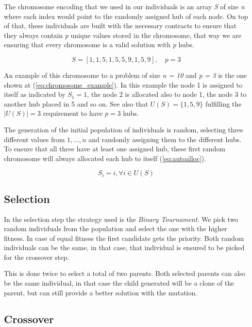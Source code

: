 \documentclass[onecolumn]{IEEEtran}
\begin{document}
The chromosome encoding that we used in our individuals is an array \emph{S} of size \emph{n} where each
index would point to the randomly assigned hub of each node. On top of that, these individuals are built
with the necessary contracts to ensure that they always contain \emph{p} unique values stored in the chromosome,
that way we are ensuring that every chromosome is a valid solution with \emph{p} hubs.

\begin{equation}
  S = [1, 1, 5, 1, 5, 5, 9, 1, 5, 9 ],\quad p = 3 \label{eq:chromosome_example}
\end{equation}

An example of this chromosome to a problem of size \emph{n = 10} and \emph{p = 3} is the one shown
at (\ref{eq:chromosome_example}). In this example the node 1 is assigned to itself as indicated
by $S_{1}=1$, the node 2 is allocated also to node 1, the node 3 to another hub placed in 5 and so on.
See also that $U(S)=\{1,5,9\}$ fulfilling the $|U(S)|=3$ requirement to have $p=3$ hubs.

The generation of the initial population of individuals is random, selecting three different values from
${1,\dots,n}$ and randomly assigning them to the different hubs. To ensure that all three have at least
one assigned hub, these first random chromosome will always allocated each hub to itself (\ref{eq:autoalloc}).

\begin{equation}
  S_{i}=i, \forall i \in U(S) \label{eq:autoalloc}
\end{equation}

\subsection{Selection}

In the selection step the strategy used is the \emph{Binary Tournament}. We pick two random individuals from
the population and select the one with the higher fitness. In case of equal fitness the first candidate
gets the priority. Both random individuals can be the same, in that case, that individual is ensured to
be picked for the crossover step.

This is done twice to select a total of two parents.  Both selected parents can also be the same individual,
in that case the child generated will be a clone of the parent, but can still provide a better solution with
the mutation.

\subsection{Crossover\label{ss:crossover}}
\end{document}
